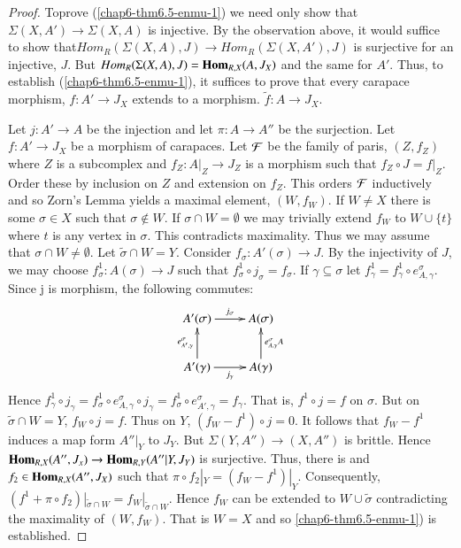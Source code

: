 \begin{proof}
To\pageoriginale prove (\ref{chap6-thm6.5-enmu-1}) we need only show that $\Sigma(X, A') \rightarrow \Sigma(X, A)$ is injective. By the observation above, it would suffice to show that\break $Hom_{R}(\Sigma(X, A), J) \rightarrow Hom_{R}(\Sigma(X, A'), J)$ is surjective for an injective, $J$. But $Hom_{R}(\Sigma(X, A), J) = \operatorname{\mathbf{Hom}}_{R, X}(A, J_{X})$ and the same for $A'$. Thus, to establish (\ref{chap6-thm6.5-enmu-1}), it suffices to prove that every carapace morphism, $f:A'\rightarrow J_{X}$ extends to a morphism. $\tilde{f}: A\rightarrow J_{X}$.

Let $j : A' \rightarrow A$ be the injection and let $\pi : A\rightarrow A''$ be the surjection. Let $f: A' \rightarrow J_{X}$ be a morphism of carapaces. Let $\mathcal{F}$ be the family of paris, $(Z, f_{Z})$ where $Z$ is a subcomplex and $f_{Z}:A|_{Z} \rightarrow J_{Z}$ is a morphism such that $f_{Z}\circ J = f|_{Z}$. Order these by inclusion on $Z$ and extension on $f_{Z}$. This orders $\mathcal{F}$ inductively and so Zorn's Lemma yields a maximal element, $(W, f_{W})$. If $W \neq X$ there is some $\sigma \in X$ such that $\sigma \notin W$. If $\sigma \cap W = \emptyset$ we may trivially extend $f_{W}$ to $W \cup \{t\}$ where $t$ is any vertex in $\sigma$. This contradicts maximality. Thus we may assume that $\sigma \cap W \neq \emptyset$. Let $\tilde{\sigma} \cap W =Y$. Consider $f_{\sigma} : A'(\sigma)\rightarrow J$. By the injectivity of $J$, we may choose $f_{\sigma}^{1}: A(\sigma) \rightarrow J$ such  that $f_{\sigma}^{1} \circ j_{\sigma} = f_{\sigma}$.  If $\gamma \subseteq \sigma$ let $f_{\gamma}^{1}=f_{\gamma}^{1} \circ e_{A, \gamma}^{\sigma}$. Since j is morphism, the following commutes:
$$
\xymatrix{ 
\ar@{}[dr]|{}
A'(\sigma) \ar[r]^-{j_{\sigma}} & A(\sigma)  \\
 A'(\gamma)\ar[u]^-{e_{A', \gamma}^{\sigma}}\ar[r]_-{j_{\gamma}} & A(\gamma)\ar[u]_-{e_{A, \gamma}^{\sigma} A}  }
$$
Hence $f_{\gamma}^{1} \circ j_{\gamma} = f_{\sigma}^{1}\circ e_{A, \gamma}^{\sigma}\circ j_{\gamma} = f_{\sigma}^{1}\circ e_{A', \gamma}^{\sigma} = f_{\gamma}$. That is, $f^{1} \circ j = f$ on $\sigma$. But on
$\tilde{\sigma} \cap W = Y$, $f_{W}\circ j = f$. Thus on $Y$, $(f_{W}-f^{1})\circ j =0$. It follows that $f_{W}-f^{1}$ induces a map form $A''|_{Y}$ to $J_{Y}$. But $\Sigma(Y, A'')\rightarrow (X, A'')$ is brittle. Hence $\operatorname{\mathbf{Hom}}_{R, X}(A'', J_{x})\rightarrow \operatorname{\mathbf{Hom}}_{R, Y}(A''|Y, J_{Y})$ is surjective. Thus, there is and $f_{2} \in \operatorname{\mathbf{Hom}}_{R, X}(A'', J_{X})$ such that $\pi \circ f_{2}|_{Y} =  (f_{W}-f^{1})|_{Y}$. Consequently, $(f^{1}+ \pi \circ f_{2})|_{\tilde{\sigma}\cap W}=f_{W}|_{\tilde{\sigma}\cap W}$. Hence $f_{W}$ can be extended to $W\cup \tilde{\sigma}$ contradicting the maximality of $(W, f_{W})$. That is $W = X$ and so \ref{chap6-thm6.5-enmu-1}) is established.


\end{proof}
